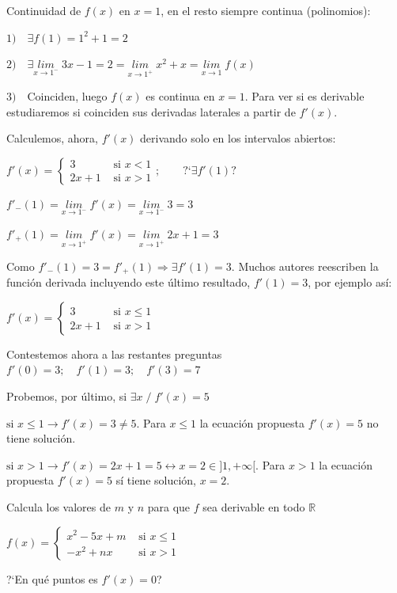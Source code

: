 	\begin{proofw}\renewcommand{\qedsymbol}{$\diamond$}
	
	Continuidad de $f(x)$ en $x=1$, en el resto siempre continua (polinomios):
	
	$1) \quad \exists f(1)=1^2+1=2$
	
	$2) \quad \exists \underset{x\to 1^-}{lim}\;{3x-1}=2=\underset{x\to 1^+}{lim}\;{x^2+x}=\underset{x\to 1}{lim}\;{f(x)}$
	
	$3) \quad $Coinciden, luego $f(x)$ es continua en $x=1$. Para ver si es derivable estudiaremos si coinciden sus derivadas laterales a partir de $f'(x)$.
	
	Calculemos, ahora, $f'(x)$ derivando solo en los intervalos abiertos:
	
	$f'(x)=
		\begin{cases}
		3 & \mbox{ si } x< 1 \\
		2x+1 & \mbox{ si } x >1  
		\end{cases} ; \qquad \mbox{?`} \exists f'(1)?$
		
		$f'_-(1)=\underset{x\to 1^-}{lim}\;{f'(x)}=\underset{x\to 1^-}{lim}\;{3}=3$
		
		$f'_+(1)=\underset{x\to 1^+}{lim}\;{f'(x)}=\underset{x\to 1^+}{lim}\;{2x+1}=3$
		
		Como $f'_-(1)=3=f'_+(1) \Rightarrow \exists f'(1)=3$. Muchos autores reescriben la función derivada incluyendo este último resultado, $f'(1)=3$, por ejemplo así:
		
			$f'(x)=
		\begin{cases}
		3 & \mbox{ si } x\le 1 \\
		2x+1 & \mbox{ si } x >1  
		\end{cases} $
		
		Contestemos ahora a las restantes preguntas $f'(0)= 3;\quad f'(1)=3;\quad  f'(3)=7$
		
		Probemos, por último, si $\exists x \; / \;  f'(x)=5$
		
		$\mbox{si }x\le 1 \to f'(x)=3 \neq 5$. Para $x\le 1$ la ecuación propuesta $f'(x)=5$ no tiene solución.
		
		$\mbox{si }x> 1 \to f'(x)=2x+1 =5 \leftrightarrow x=2 \in ]1,+\infty[$. Para $x> 1$ la ecuación propuesta $f'(x)=5$ sí tiene solución, $x=2$.
		
	
	\end{proofw}
	
	\begin{ejre} 	Calcula los valores de $m$ y $n$ para que $f$ sea derivable en todo $\mathbb R$ 
	
		$f(x)=
		\begin{cases}
		x^2-5x+m & \mbox{ si } x\le 1 \\
		-x^2+nx & \mbox{ si } x >1  
		\end{cases} $
		
		?`En qué puntos es $f'(x)=0$?
	\end{ejre}
	
